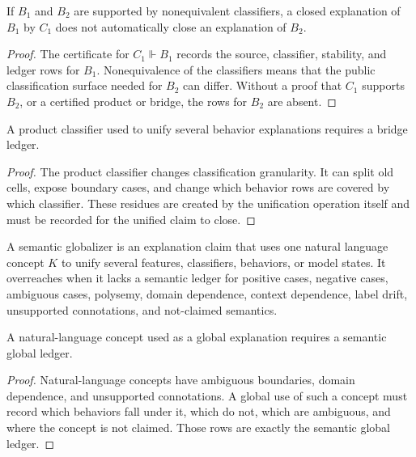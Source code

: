 \begin{theorem}
\label{thm:philosophy-single-classifier-not-many-behaviors}
If $B_1$ and $B_2$ are supported by nonequivalent classifiers, a closed
explanation of $B_1$ by $C_1$ does not automatically close an explanation
of $B_2$.
\end{theorem}
\begin{proof}
The certificate for $C_1\Vdash B_1$ records the source, classifier,
stability, and ledger rows for $B_1$. Nonequivalence of the classifiers
means that the public classification surface needed for $B_2$ can differ.
Without a proof that $C_1$ supports $B_2$, or a certified product or
bridge, the rows for $B_2$ are absent.
\end{proof}

\begin{theorem}
\label{thm:philosophy-product-classifiers-require-bridge-ledgers}
A product classifier used to unify several behavior explanations requires
a bridge ledger.
\end{theorem}
\begin{proof}
The product classifier changes classification granularity. It can split
old cells, expose boundary cases, and change which behavior rows are
covered by which classifier. These residues are created by the
unification operation itself and must be recorded for the unified claim
to close.
\end{proof}

\begin{definition}
\label{def:philosophy-semantic-globalizer}
A semantic globalizer is an explanation claim that uses one natural
language concept $K$ to unify several features, classifiers, behaviors,
or model states. It overreaches when it lacks a semantic ledger for
positive cases, negative cases, ambiguous cases, polysemy, domain
dependence, context dependence, label drift, unsupported connotations,
and not-claimed semantics.
\end{definition}

\begin{theorem}
\label{thm:philosophy-semantic-globalization-requires-semantic-ledger}
A natural-language concept used as a global explanation requires a
semantic global ledger.
\end{theorem}
\begin{proof}
Natural-language concepts have ambiguous boundaries, domain dependence,
and unsupported connotations. A global use of such a concept must record
which behaviors fall under it, which do not, which are ambiguous, and
where the concept is not claimed. Those rows are exactly the semantic
global ledger.
\end{proof}

